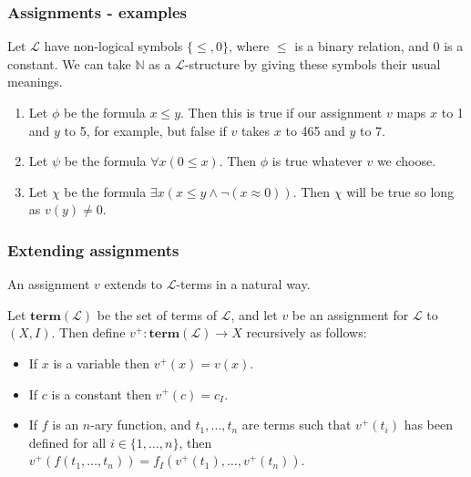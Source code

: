 \documentclass[handout]{beamer}
\newcommand{\trm}{\mathbf{term}}
\newcommand{\sL}{\mathscr{L}}
\newcommand{\bN}{\mathbb{N}}
\begin{document}
\begin{frame}
\frametitle{Assignments - examples}
\begin{example}
Let $\sL$ have non-logical symbols $\{\leq, 0\}$, where $\leq$ is a binary relation, and $0$ is a constant. We can take $\bN$ as a $\sL$-structure by giving these symbols their usual meanings. 
\begin{enumerate}
\item Let $\phi$ be the formula $x\leq y$. Then this is true if our assignment $v$ maps $x$ to 1 and $y$ to 5, for example, but false if $v$ takes $x$ to 465 and $y$ to 7.  
\item Let $\psi$ be the formula $\forall x(0\leq x)$. Then $\phi$ is true whatever $v$ we choose.  
\item Let $\chi$ be the formula $\exists x(x\leq y \wedge \neg(x\approx 0))$. Then $\chi$ will be true so long as $v(y)\neq 0$.
\end{enumerate}
\end{example} 
\end{frame}


\begin{frame}
\frametitle{Extending assignments}
An assignment $v$ extends to $\sL$-terms in a natural way.
\begin{definition}[$v^+$]
Let $\trm(\sL)$ be the set of terms of $\sL$, and let $v$ be an assignment for $\sL$ to $(X,I)$. Then define $v^+:\trm(\sL)\to X$ recursively as follows:
\begin{itemize}
\item If $x$ is a variable then $v^+(x)=v(x)$.
\item If $c$ is a constant then $v^+(c)= c_I$.
\item If $f$ is an $n$-ary function, and $t_1,\ldots,t_n$ are terms such that $v^+(t_i)$ has been defined for all $i\in\{1,\ldots,n\}$, then $v^+(f(t_1,\ldots,t_n))=f_I(v^+(t_1),\ldots,v^+(t_n))$.
\end{itemize}
\end{definition}
\end{frame}
\end{document}
